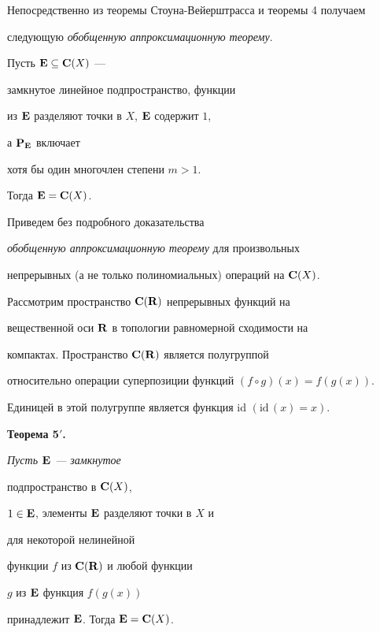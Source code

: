 Непосредственно из теоремы Стоуна-Вейерштрасса и теоремы 4 получаем


следующую {\it обобщенную аппроксимационную теорему}.





\begin{thm} Пусть ${\bold E} \subseteq {\bold C}(X)$ ---


замкнутое линейное подпространство, функции


из ${\bold E}$ разделяют точки в $X$, ${\bold E}$ содержит $1$,


а $\bold P_{\bold E}$ включает


хотя бы один многочлен степени $m>1$.


Тогда ${\bold E}={\bold C}(X)$.


\end{thm}





Приведем без подробного доказательства


{\it обобщенную аппроксимационную теорему} для произвольных


непрерывных (а не только полиномиальных) операций на ${\bold C}(X)$.


Рассмотрим пространство ${\bold C}({\bold R})$ непрерывных функций на


вещественной оси ${\bold R}$ в топологии равномерной сходимости на


компактах. Пространство ${\bold C}({\bold R})$ является полугруппой


относительно операции суперпозиции функций $(f \circ g)(x)=f(g(x))$.


Единицей в этой полугруппе является функция id $(\text{id}\,(x) = x)$.


\medskip








{\bf Теорема 5$'$.} {\it Пусть ${\bold E}$ --- замкнутое


подпространство в ${\bold C}(X)$,


$1 \in {\bold E}$, элементы ${\bold E}$ разделяют точки в $X$ и


для некоторой нелинейной


функции $f$ из ${\bold C}({\bold R})$ и любой функции


$g$ из ${\bold E}$ функция $f(g(x))$


принадлежит ${\bold E}$. Тогда ${\bold E}={\bold C}(X)$.}



